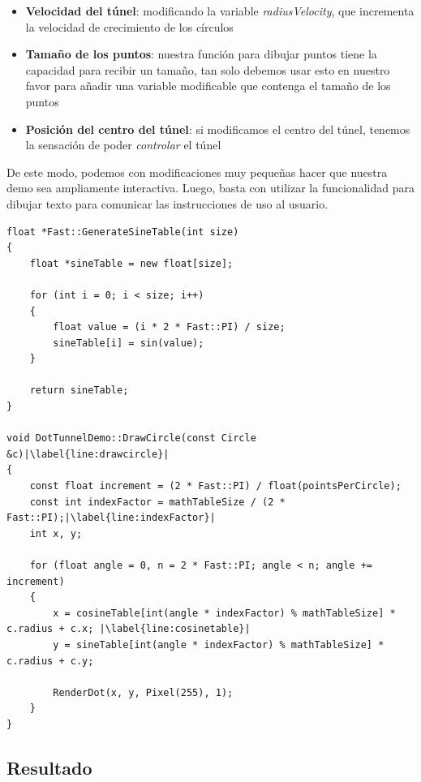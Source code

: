 \begin{itemize}
	\begin{itemize}
		\item \textbf{Velocidad del túnel}: modificando la variable \emph{radiusVelocity}, que incrementa la velocidad de crecimiento de los círculos
		\item \textbf{Tamaño de los puntos}: nuestra función para dibujar puntos tiene la capacidad para recibir un tamaño, tan solo debemos usar esto en nuestro favor para añadir una variable modificable que contenga el tamaño de los puntos
		\item \textbf{Posición del centro del túnel}: si modificamos el centro del túnel, tenemos la sensación de poder \emph{controlar} el túnel
	\end{itemize}
	
	De este modo, podemos con modificaciones muy pequeñas hacer que nuestra demo sea ampliamente interactiva. Luego, basta con utilizar la funcionalidad para dibujar texto para comunicar las instrucciones de uso al usuario.
	
\end{itemize}

\begin{lstlisting}[style=C-color, caption={Generación de tablas precalculadas y uso en código}, label=cod:generatesinetable, escapechar=|]
float *Fast::GenerateSineTable(int size)
{
    float *sineTable = new float[size];

    for (int i = 0; i < size; i++)
    {
        float value = (i * 2 * Fast::PI) / size;
        sineTable[i] = sin(value);
    }

    return sineTable;
}

void DotTunnelDemo::DrawCircle(const Circle &c)|\label{line:drawcircle}|
{
    const float increment = (2 * Fast::PI) / float(pointsPerCircle);
    const int indexFactor = mathTableSize / (2 * Fast::PI);|\label{line:indexFactor}|
    int x, y;

    for (float angle = 0, n = 2 * Fast::PI; angle < n; angle += increment)
    {
        x = cosineTable[int(angle * indexFactor) % mathTableSize] * c.radius + c.x; |\label{line:cosinetable}|
        y = sineTable[int(angle * indexFactor) % mathTableSize] * c.radius + c.y;
        
        RenderDot(x, y, Pixel(255), 1);
    }
}
\end{lstlisting}

\subsection{Resultado}

